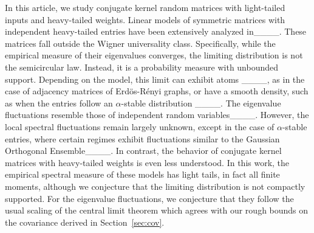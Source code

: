 In this article, we study conjugate kernel random matrices with light-tailed inputs and heavy-tailed weights. Linear models of symmetric matrices with independent heavy-tailed entries have been extensively analyzed in____. These matrices fall outside the Wigner universality class. Specifically, while the empirical measure of their eigenvalues converges, the limiting distribution is not the semicircular law. Instead, it is a probability measure with unbounded support. Depending on the model, this limit can exhibit atoms ____, as in the case of adjacency matrices of Erd\"os-R\'enyi graphs, or have a smooth density, such as when the entries follow an \(\alpha\)-stable distribution ____. The eigenvalue fluctuations resemble those of independent random variables____. However, the local spectral fluctuations remain largely unknown, except in the case of \(\alpha\)-stable entries, where certain regimes exhibit fluctuations similar to the Gaussian Orthogonal Ensemble____. In contrast, the behavior of conjugate kernel matrices with heavy-tailed weights is even less understood. In this work, the empirical spectral measure of these models has light tails, in fact all finite moments, although we conjecture that the limiting distribution is not compactly supported. For the eigenvalue fluctuations, we conjecture that they follow the usual scaling of the central limit theorem which agrees with our rough bounds on the covariance derived in Section~\ref{sec:cov}.
